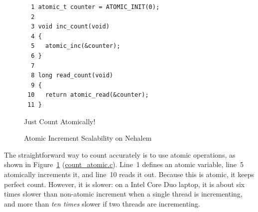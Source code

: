 \begin{figure}[bp]
{ \scriptsize
\begin{verbatim}
  1 atomic_t counter = ATOMIC_INIT(0);
  2 
  3 void inc_count(void)
  4 {
  5   atomic_inc(&counter);
  6 }
  7 
  8 long read_count(void)
  9 {
 10   return atomic_read(&counter);
 11 }
\end{verbatim}
}
\caption{Just Count Atomically!}
\label{fig:count:Just Count Atomically!}
\end{figure}

\begin{figure}[tb]
\begin{center}
\end{center}
\caption{Atomic Increment Scalability on Nehalem}
\label{fig:count:Atomic Increment Scalability on Nehalem}
\end{figure}

The straightforward way to count accurately is to use atomic operations,
as shown in
Figure~\ref{fig:count:Just Count Atomically!} (\url{count_atomic.c}).
Line~1 defines an atomic variable, line~5 atomically increments it, and
line~10 reads it out.
Because this is atomic, it keeps perfect count.
However, it is slower: on a Intel Core Duo laptop, it is about
six times slower than non-atomic increment
when a single thread is incrementing, and more than \emph{ten times}
slower if two threads are incrementing.

